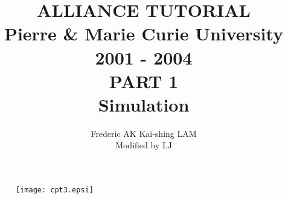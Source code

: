 \documentclass{article}
\begin{document}
\setlength{\footrulewidth}{0.6pt}

\title{
                    {\Huge ALLIANCE TUTORIAL\\}
	 {\large
               Pierre \& Marie Curie University \\
                    2001 - 2004\\
    }
    \vspace{1cm}
    {\huge
                      PART 1\\
                Simulation
    }
}
\date{}
      
\author{Frederic AK \hspace{2cm}  Kai-shing LAM\\
Modified by LJ
}

\maketitle

\begin{figure}[H]\centering
  \texttt{[image: cpt3.epsi]}
\end{figure}

\begin{figure}
\end{figure}

\thispagestyle{empty}
\def\myfbox#1{\vspace*{3mm}\fbox{#1}\vspace{3mm}}

        \vspace{3cm}
\end{document}
